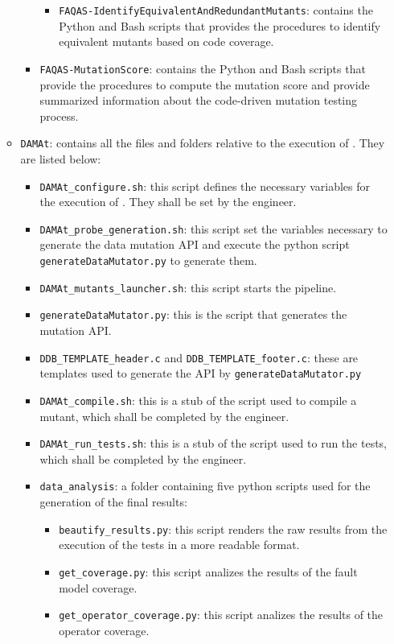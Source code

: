 \begin{itemize}
\begin{itemize}
\begin{itemize}
\begin{itemize}
				\item \texttt{FAQAS-IdentifyEquivalentAndRedundantMutants}: contains the Python and Bash scripts that provides the procedures to identify equivalent mutants based on code coverage.
			\end{itemize}
			\item \texttt{FAQAS-MutationScore}: contains the Python and Bash scripts that provide the procedures to compute the mutation score and provide summarized information about the code-driven mutation testing process.
		\end{itemize}
		\item \texttt{DAMAt}: contains all the files and folders relative to the execution of \DAMA. They are listed below:
	\begin{itemize}
			\item \texttt{DAMAt\_configure.sh}: this script defines the necessary variables for the execution of \DAMA. They shall be set by the engineer.
			\item \texttt{DAMAt\_probe\_generation.sh}: this script set the variables necessary to generate the data mutation API and execute the python script \texttt{generateDataMutator.py} to generate them.
			\item \texttt{DAMAt\_mutants\_launcher.sh}: this script starts the \DAMA pipeline.
			\item \texttt{generateDataMutator.py}: this is the script that generates the \DAMA mutation API.
			\item \texttt{DDB\_TEMPLATE\_header.c} and \texttt{DDB\_TEMPLATE\_footer.c}: these are templates used to generate the \DAMA API by \texttt{generateDataMutator.py}
			\item \texttt{DAMAt\_compile.sh}: this is a stub of the script used to compile a mutant, which shall be completed by the engineer.
			\item \texttt{DAMAt\_run\_tests.sh}: this is a stub of the script used to run the tests, which shall be completed by the engineer.
			\item \texttt{data\_analysis}: a folder containing five python scripts used for the generation of the final results:
			\begin{itemize}
				\item \texttt{beautify\_results.py}: this script renders the raw results from the execution of the tests in a more readable format.
				\item \texttt{get\_coverage.py}: this script analizes the results of the fault model coverage.
				\item \texttt{get\_operator\_coverage.py}: this script analizes the results of the operator coverage.

\end{itemize}
\end{itemize}
\end{itemize}
\end{itemize}
